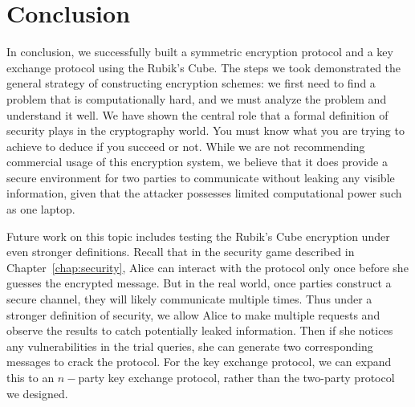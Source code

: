\chapter{Conclusion}\label{chap:conclusion}
\par In conclusion, we successfully built a symmetric encryption protocol and a key exchange protocol using the Rubik's Cube. The steps we took demonstrated the general strategy of constructing encryption schemes: we first need to find a problem that is computationally hard, and we must analyze the problem and understand it well. We have shown the central role that a formal definition of security plays in the cryptography world. You must know what you are trying to achieve to deduce if you succeed or not. While we are not recommending commercial usage of this encryption system, we believe that it does provide a secure environment for two parties to communicate without leaking any visible information, given that the attacker possesses limited computational power such as one laptop.
\par Future work on this topic includes testing the Rubik's Cube encryption under even stronger definitions. Recall that in the security game described in Chapter~\ref{chap:security}, Alice can interact with the protocol only once before she guesses the encrypted message. But in the real world, once parties construct a secure channel, they will likely communicate multiple times. Thus under a stronger definition of security, we allow Alice to make multiple requests and observe the results to catch potentially leaked information. Then if she notices any vulnerabilities in the trial queries, she can generate two corresponding messages to crack the protocol. For the key exchange protocol, we can expand this to an $n-$party key exchange protocol, rather than the two-party protocol we designed.